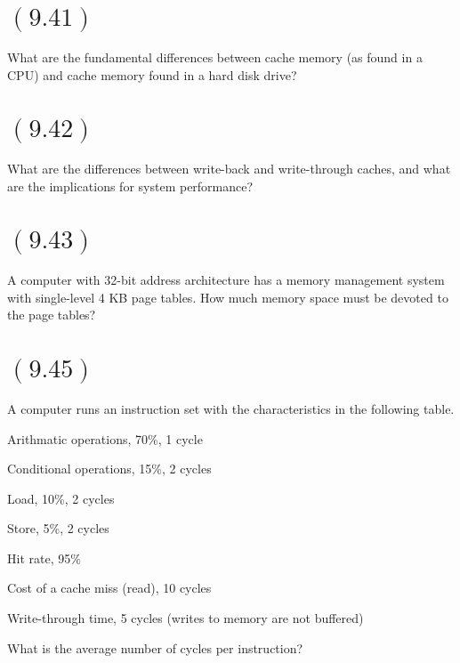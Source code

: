\documentclass[letterpaper,12pt,titlepage]{article}
\begin{document}
\section*{$(9.41)$} What are the fundamental differences between cache memory (as found in a CPU) and cache memory found in a hard disk drive?

\begin{mdframed}[style=MyFrame]
\end{mdframed}

\section*{$(9.42)$} What are the differences between write-back and write-through caches, and what are the implications for system performance?

\begin{mdframed}[style=MyFrame]
\end{mdframed}

\section*{$(9.43)$} A computer with 32-bit address architecture has a memory management system with single-level 4 KB page tables. How much memory space must be devoted to the page tables?

\begin{mdframed}[style=MyFrame]
\end{mdframed}

\section*{$(9.45)$} A computer runs an instruction set with the characteristics in the following table.

Arithmatic operations, 70\%, 1 cycle

Conditional operations, 15\%, 2 cycles

Load, 10\%, 2 cycles

Store, 5\%, 2 cycles

Hit rate, 95\%

Cost of a cache miss (read), 10 cycles

Write-through time, 5 cycles (writes to memory are not buffered)

What is the average number of cycles per instruction?

\begin{mdframed}[style=MyFrame]
\end{mdframed}
\end{document}
